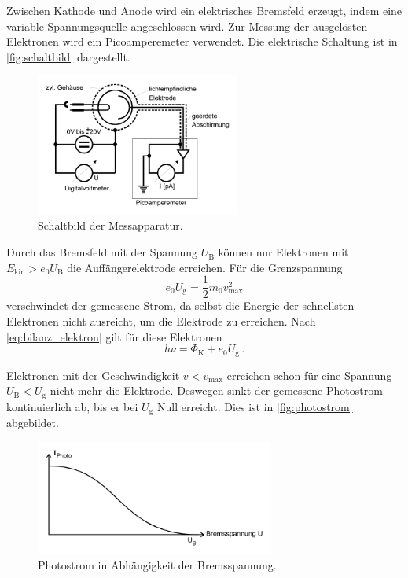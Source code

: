 Zwischen Kathode und Anode wird ein elektrisches Bremsfeld erzeugt, 
indem eine variable Spannungsquelle angeschlossen wird. 
Zur Messung der ausgelösten Elektronen wird ein Picoamperemeter verwendet.
Die elektrische Schaltung ist in \autoref{fig:schaltbild} dargestellt.
\begin{figure}
    \centering
    \includegraphics[width=0.6\textwidth]{bilder/schaltbild.pdf}
    \caption{Schaltbild der Messapparatur. \cite{v500}}
    \label{fig:schaltbild}
\end{figure}

Durch das Bremsfeld mit der Spannung $U_\text{B}$ können nur Elektronen mit
$E_\text{kin} > e_0 U_\text{B} $ die Auffängerelektrode erreichen. 
Für die Grenzspannung
\begin{equation}
    e_{0} U_\text{g} = \frac{1}{2} m_{0} v_\text{max}^{2}  \label{eq:grenzspannung}
\end{equation}
verschwindet der gemessene Strom, da selbst die Energie der schnellsten Elektronen nicht
ausreicht, um die Elektrode zu erreichen. 
Nach \autoref{eq:bilanz_elektron} gilt für diese Elektronen
\begin{equation}
    h \nu = \Phi_\text{K} + e_{0} U_\text{g} \, .   \label{eq:schnellste_elektronen} 
\end{equation}

Elektronen mit der Geschwindigkeit $v < v_\text{max}$ erreichen schon für eine Spannung
$U_\text{B} < U_\text{g}$ nicht mehr die Elektrode. 
Deswegen sinkt der gemessene Photostrom kontinuierlich ab, bis er bei $U_\text{g}$ Null erreicht. 
Dies ist in \autoref{fig:photostrom} abgebildet.
\begin{figure}
    \centering
    \includegraphics[width=0.7\textwidth]{bilder/photostrom.pdf}
    \caption{Photostrom in Abhängigkeit der Bremsspannung. \cite{v500}}
    \label{fig:photostrom}
\end{figure}

